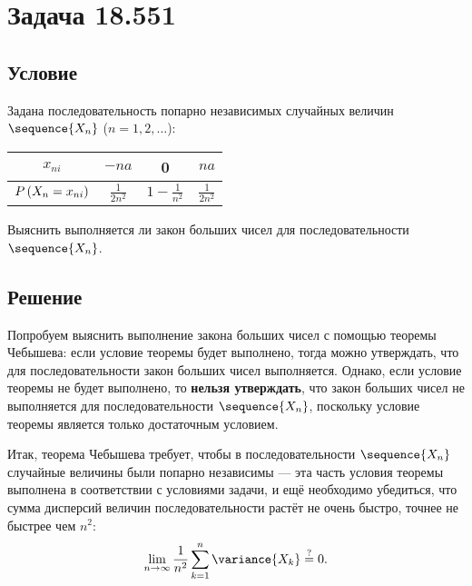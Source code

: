 \documentclass[a4paper,12pt]{article}
\begin{document}
    \section{Задача 18.551}
    \subsection*{Условие}
    Задана последовательность попарно независимых случайных величин $\sequence{X_n}$ ($n=1,2,\dots$):

    \begin{tabular}{|c|c|c|c|}
        \hline
        $x_{ni}$                     & $-n a$            & 0                   & $na$             \\
        \hline
        $P \left ( X_n = x_{ni} \right )$ & $\frac{1}{2 n^2}$ & $1 - \frac{1}{n^2}$ & $\frac{1}{2n^2}$ \\
        \hline
    \end{tabular}

    Выяснить выполняется ли закон больших чисел для последовательности $\sequence{X_n}$.

    \subsection*{Решение}
    Попробуем выяснить выполнение закона больших чисел с помощью теоремы Чебышева: если условие теоремы будет выполнено,
    тогда можно утверждать, что для последовательности закон больших чисел выполняется. Однако, если условие теоремы не будет выполнено, то
    \textbf{нельзя утверждать}, что закон больших чисел не выполняется для последовательности $\sequence{X_n}$, поскольку условие теоремы является только достаточным условием.

    Итак, теорема Чебышева требует, чтобы в последовательности $\sequence{X_n}$ случайные величины были попарно независимы --- эта часть условия
    теоремы выполнена в соответствии с условиями задачи, и ещё необходимо убедиться, что сумма дисперсий величин последовательности растёт не очень быстро,
    точнее не быстрее чем $n^2$:
    \begin{equation}
        \lim_{n \rightarrow \infty} \frac{1}{n^2} \sum_{k=1}^n \variance{X_k} \stackrel{?}{=} 0 .
    \end{equation}
\end{document}
